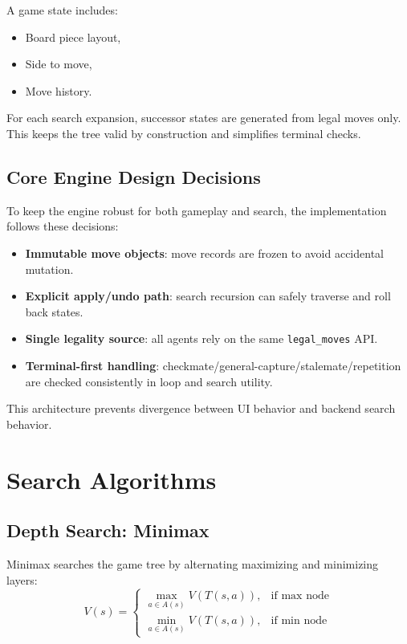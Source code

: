 \documentclass[a4paper,12pt]{article}
\begin{document}
A game state includes:
\begin{itemize}
    \item Board piece layout,
    \item Side to move,
    \item Move history.
\end{itemize}

For each search expansion, successor states are generated from legal moves only. This keeps the tree valid by construction and simplifies terminal checks.

\subsection{Core Engine Design Decisions}

To keep the engine robust for both gameplay and search, the implementation follows these decisions:
\begin{itemize}
  \item \textbf{Immutable move objects}: move records are frozen to avoid accidental mutation.
  \item \textbf{Explicit apply/undo path}: search recursion can safely traverse and roll back states.
  \item \textbf{Single legality source}: all agents rely on the same \texttt{legal\_moves} API.
  \item \textbf{Terminal-first handling}: checkmate/general-capture/stalemate/repetition are checked consistently in loop and search utility.
\end{itemize}

This architecture prevents divergence between UI behavior and backend search behavior.


\section{Search Algorithms}

\subsection{Depth Search: Minimax}

Minimax searches the game tree by alternating maximizing and minimizing layers:
\[
V(s) =
\begin{cases}
\max\limits_{a \in A(s)} V(T(s,a)), & \text{if max node} \\
\min\limits_{a \in A(s)} V(T(s,a)), & \text{if min node}
\end{cases}
\]
\end{document}
